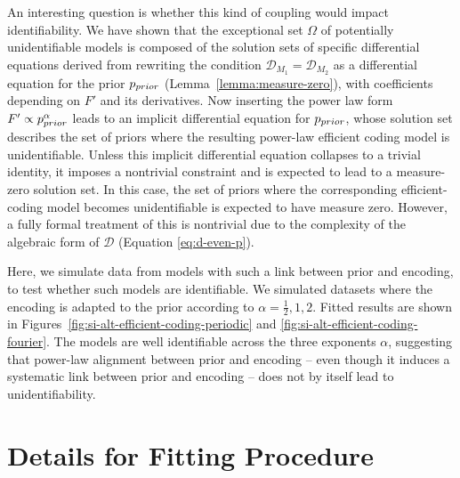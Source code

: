 \documentclass[si.tex]{subfiles}
\begin{document}
An interesting question is whether this kind of coupling would impact identifiability.
We have shown that the exceptional set $\Omega$ of potentially unidentifiable models is composed of the solution sets of specific differential equations derived from rewriting the condition
 $\mathcal{D}_{M_1} = \mathcal{D}_{M_2}$ as a differential equation for the prior $p_{prior}$ (Lemma~\ref{lemma:measure-zero}), with coefficients depending on $F'$ and its derivatives.
Now inserting the power law form $F' \propto p_{prior}^\alpha$ leads to an implicit differential equation for $p_{prior}$, whose solution set describes the set of priors where the resulting power-law efficient coding model is unidentifiable.
Unless this implicit differential equation collapses to a trivial identity, it imposes a nontrivial constraint and is expected to lead to a measure-zero solution set.
In this case, the set of priors where the corresponding efficient-coding model becomes unidentifiable is expected to have measure zero.
However, a fully formal treatment of this is nontrivial due to the complexity of the algebraic form of $\mathcal{D}$ (Equation \ref{eq:d-even-p}).

Here, we simulate data from models with such a link between prior and encoding, to test whether such models are identifiable.
We simulated datasets where the encoding is adapted to the prior according to $\alpha = \frac{1}{2}, 1, 2$.
Fitted results are shown in Figures~\ref{fig:si-alt-efficient-coding-periodic} and \ref{fig:si-alt-efficient-coding-fourier}.
The models are well identifiable across the three exponents $\alpha$, suggesting that power-law alignment between prior and encoding -- even though it induces a systematic link between prior and encoding -- does not by itself lead to unidentifiability.






\clearpage



\section{Details for Fitting Procedure}
\label{sec:tutorial}


\end{document}
